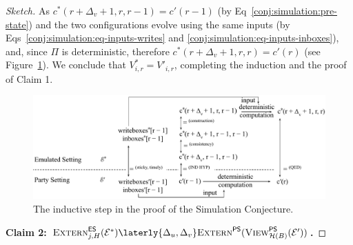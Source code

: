 \begin{proof}[Sketch]
  As $c^*(r + \Delta_v + 1, r, r - 1) = c'(r - 1)$ (by Eq~\ref{conj:simulation:pre-state})
  and the two configurations evolve using the same inputs (by
  Eqs~\ref{conj:simulation:eq-inputs-writes} and \ref{conj:simulation:eq-inputs-inboxes}),
  and, since $\Pi$ is deterministic,
  therefore $c^*(r + \Delta_v + 1, r, r) = c'(r)$ (see Figure~\ref{fig.emulation-claim-1-induction}).
  We conclude that $V^*_{i,r} = V'_{i,r}$, completing the induction
  and the proof of Claim 1.

  \begin{figure}
    \centering
    \includegraphics[width=\textwidth,keepaspectratio]{figures/emulation-claim-1-induction.pdf}
    \caption{The inductive step in the proof of the Simulation Conjecture.}
    \label{fig.emulation-claim-1-induction}
  \end{figure}


  \noindent
  \textbf{Claim 2: $\LCExtern_{j,H}(\mathcal{E}^*) \laterly{\Delta_u,\Delta_v} \PEExtern(\PEView_{\mathcal{H}(B)}(\mathcal{E}'))$.}


\end{proof}
